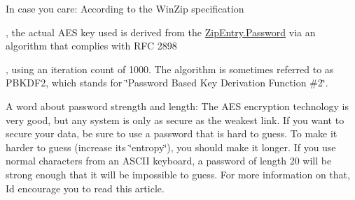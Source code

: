 In case you care\+: According to the Win\+Zip specification

, the actual A\+ES key used is derived from the \mbox{\hyperlink{class_super_tiled2_unity_1_1_ionic_1_1_zip_1_1_zip_entry_a4e1ce23f98c2e3a60a2d47a25a243a82}{Zip\+Entry.\+Password}} via an algorithm that complies with R\+FC 2898

, using an iteration count of 1000. The algorithm is sometimes referred to as P\+B\+K\+D\+F2, which stands for \char`\"{}\+Password Based Key Derivation Function \#2\char`\"{}. 

A word about password strength and length\+: The A\+ES encryption technology is very good, but any system is only as secure as the weakest link. If you want to secure your data, be sure to use a password that is hard to guess. To make it harder to guess (increase its \char`\"{}entropy\char`\"{}), you should make it longer. If you use normal characters from an A\+S\+C\+II keyboard, a password of length 20 will be strong enough that it will be impossible to guess. For more information on that, I\textquotesingle{}d encourage you to read this article.

